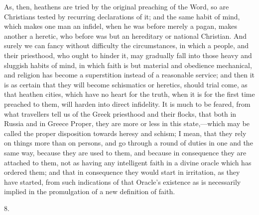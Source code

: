 As, then, heathens are tried by the original preaching of the Word,
so are Christians tested by recurring declarations of it; and the same
habit of mind, which makes one man an infidel, when he was before
merely a pagan, makes another a heretic, who before was but an
hereditary or national Christian. And surely we can fancy without
difficulty the circumstances, in which a people, and their priesthood,
who ought to hinder it, may gradually fall into those heavy and
sluggish habits of mind, in which faith is but material and obedience
mechanical, and religion has become a superstition instead of a
reasonable service; and then it is as certain that they will become
schismatics or heretics, should trial come, as that heathen cities,
which have no heart for the truth, when it is for the first time
preached to them, will harden into direct infidelity. It is much to
be
feared, from what travellers tell us of the Greek priesthood and their
flocks, that both in Russia and in Greece Proper, they are more or
less in this state,—which may be called the proper disposition
towards heresy and schism; I mean, that they rely on things more than
on persons, and go through a round of duties in one and the same way,
because they are used to them, and because in consequence they are
attached to them, not as having any intelligent faith in a divine
oracle which has ordered them; and that in consequence they would
start in irritation, as they have started, from such indications of
that Oracle's existence as is necessarily implied in the promulgation
of a new definition of faith.

8.

